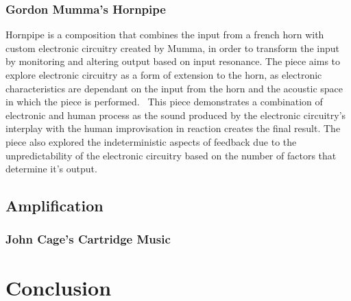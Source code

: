 \documentclass[titlepage]{scrartcl}
\begin{document}
    \subsubsection{Gordon Mumma's Hornpipe~\citeyearpar{mumma2002lem}}\label{hornpipe}
    Hornpipe is a composition that combines the input from a french horn with
    custom electronic circuitry created by Mumma, in order to transform the input by
    monitoring and altering output based on input resonance. 
    The piece aims to explore electronic circuitry as a form of extension to
    the horn, as electronic characteristics are dependant on the input from the
    horn and the acoustic space in which the piece is
    performed.~\parencite[p.101-103]{nyman1999em}
    This piece demonstrates a combination of electronic and human process as
    the sound produced by the electronic circuitry's interplay with the human
    improvisation in reaction creates the final result.
    The piece also explored the indeterministic aspects of feedback due to the
    unpredictability of the electronic circuitry based on the number of factors
    that determine it's output.

    \subsection{Amplification}\label{amp}
    \subsubsection{John Cage's Cartridge Music~\citeyearpar{cage2013cm}} 
    
    \section{Conclusion}

    \printbibliography
\end{document}
